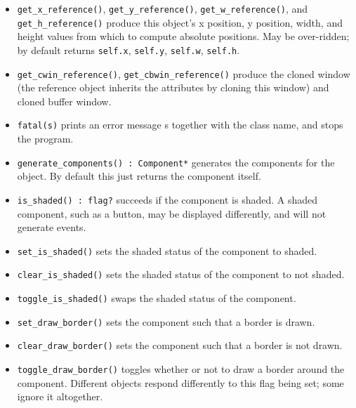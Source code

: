 \begin{itemize}
\item\noindent\texttt{get\_x\_reference()}, \texttt{get\_y\_reference()},
\texttt{get\_w\_reference()}, and
\texttt{get\_h\_reference()} produce this
object's x position, y position, width, and height
values from which to compute absolute positions. May be over-ridden;
by default returns \texttt{self.x}, \texttt{self.y}, \texttt{self.w},
\texttt{self.h}.

\item\noindent\texttt{get\_cwin\_reference()}, \texttt{get\_cbwin\_reference()} produce
the cloned window (the reference object inherits the attributes by
cloning this window) and cloned buffer window.

\item\noindent\texttt{fatal(s)} prints an error message s together with the class name, and
stops the program.

\item\noindent\texttt{generate\_components() : Component*} generates the components for the
object. By default this just returns the component itself.

\item\noindent\texttt{is\_shaded() : flag?} succeeds if the component is shaded. A shaded
component, such as a button, may be displayed differently, and will not
generate events.

\item\noindent\texttt{set\_is\_shaded()} sets the shaded status of the component to
shaded.

\item\noindent\texttt{clear\_is\_shaded()} sets the shaded status of the component to not
shaded.

\item\noindent\texttt{toggle\_is\_shaded()} swaps the shaded status of the component.

\item\noindent\texttt{set\_draw\_border()} sets the component such that a border is
drawn.

\item\noindent\texttt{clear\_draw\_border()} sets the component such that a border is not
drawn.

\item\noindent\texttt{toggle\_draw\_border()} toggles whether or not to draw a border around
the component. Different objects respond differently to this flag being
set; some ignore it altogether.


\end{itemize}
